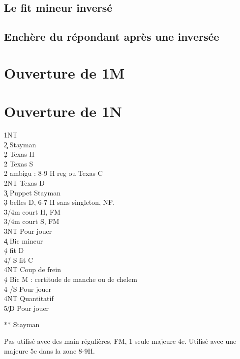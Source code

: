 \documentclass[a4paper]{article}
\begin{document}
\subsection{Le fit mineur inversé}

\subsection{Enchère du répondant après une inversée}

\section{Ouverture de 1M}


\section{Ouverture de 1N}

\begin{bidtable}
1NT\+\\
2\c \> Stayman\\
2\d \> Texas H\\
2\h \> Texas S\\
2\s \> ambigu : 8-9 H reg ou Texas C\\
2NT \> Texas D\\
3\c \> Puppet Stayman\\
3\d {} belles D, 6-7 H sans singleton, NF.\\
3\h {}/4m court H, FM\\
3\s {}/4m court S, FM\\
3NT \> Pour jouer\\
4\c \> Bic mineur\+\\
4\d \> fit D\\
4\h/ \> S fit C\\
4NT \> Coup de frein\-\\
4\d \> Bic M : certitude de manche ou de chelem\\
4\h \> /S  Pour jouer\\
4NT \> Quantitatif\\
5\c/D \> Pour jouer\-
\end{bidtable}

** Stayman

Pas utilisé avec des main régulières, FM, 1 seule majeure 4e.
Utilisé avec une majeure 5e dans la zone 8-9H.
\end{document}
